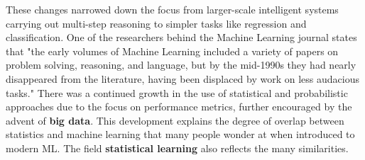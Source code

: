 \documentclass[twoside,english]{uiofysmaster}
\begin{document}
These changes narrowed down the focus from larger-scale intelligent systems carrying out multi-step reasoning to simpler tasks like regression and classification. One of the researchers behind the Machine Learning journal states that "the early volumes of Machine Learning included a variety of papers on problem solving, reasoning, and language, but by the mid-1990s they had nearly disappeared from the literature, having been displaced by work on less audacious tasks." There was a continued growth in the use of statistical and probabilistic approaches due to the focus on performance metrics, further encouraged by the advent of \textbf{big data}. This development explains the degree of overlap between statistics and machine learning that many people wonder at when introduced to modern ML. The field \textbf{statistical learning} also reflects the many similarities.

\end{document}
